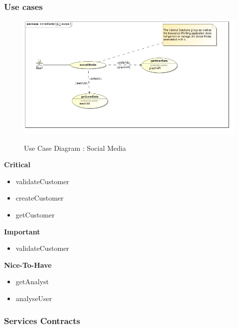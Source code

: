 \documentclass{article}
\begin{document}
		\subsubsection{Use cases}
		\begin{figure}[H]
		\includegraphics[width=\textwidth]{images/uc__socialMedia__scope.jpg}  \\
		\caption{Use Case Diagram : Social Media}
		\end{figure}

		\begin{flushleft}
			\textbf{Critical}
				\begin{itemize}
	  				\item validateCustomer
	  				\item createCustomer
	  				\item getCustomer
				\end{itemize}
			\textbf{Important}
				\begin{itemize}
	  				\item validateCustomer
				\end{itemize}
			\textbf{Nice-To-Have}
				\begin{itemize}
	  				\item getAnalyst
	  				\item analyseUser
				\end{itemize}
		\end{flushleft}

		\subsubsection{Services Contracts}
\end{document}
